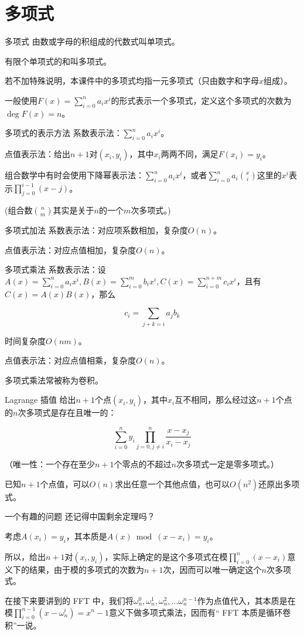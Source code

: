 \documentclass{beamer}
\begin{document}
	\section{多项式}
	\begin{frame}{多项式}
		由数或字母的积组成的代数式叫单项式。
		
		有限个单项式的和叫多项式。
		
		若不加特殊说明，本课件中的多项式均指一元多项式（只由数字和字母$x$组成）。
		
		一般使用$F(x)=\sum\limits_{i=0}^na_ix^i$的形式表示一个多项式，定义这个多项式的次数为$\deg F(x) = n$。
	\end{frame}
	\begin{frame}{多项式的表示方法}
		系数表示法：$\sum\limits_{i=0}^na_ix^i$。
		
		点值表示法：给出$n+1$对$(x_i,y_i)$，其中$x_i$两两不同，满足$F(x_i)=y_i$。
		
		组合数学中有时会使用下降幂表示法：$\sum\limits_{i=0}^na_ix^{\underline{i}}$，或者$\sum\limits_{i=0}^na_i\binom{x}{i}$这里的$x^{\underline{i}}$表示$\prod\limits_{j=0}^{i-1}(x-j)$。
		
		(组合数$\binom{n}{m}$其实是关于$n$的一个$m$次多项式。)
	\end{frame}
	\begin{frame}{多项式加法}
		系数表示法：对应项系数相加，复杂度$O(n)$。
		
		点值表示法：对应点值相加，复杂度$O(n)$。
	\end{frame}
	\begin{frame}{多项式乘法}
		系数表示法：设$A(x)=\sum\limits_{i=0}^na_ix^i,B(x)=\sum\limits_{i=0}^mb_ix^i,C(x)=\sum\limits_{i=0}^{n+m}c_ix^i$，且有$C(x)=A(x)B(x)$，那么
		
		$$c_i=\sum_{j+k=i}a_jb_k$$
		
		时间复杂度$O(nm)$。
		
		点值表示法：对应点值相乘，复杂度$O(n)$。
		
		多项式乘法常被称为卷积。
	\end{frame}
	\begin{frame}{Lagrange 插值}
		给出$n+1$个点$(x_i,y_i)$，其中$x_i$互不相同，那么经过这$n+1$个点的$n$次多项式是存在且唯一的：
		
		$$\sum_{i=0}^ny_i\prod_{j=0,j\neq i}^n\frac{x-x_j}{x_i-x_j}$$
		
		（唯一性：一个存在至少$n+1$个零点的不超过$n$次多项式一定是零多项式。）
		
		已知$n+1$个点值，可以$O(n)$求出任意一个其他点值，也可以$O(n^2)$还原出多项式。
	\end{frame}
	\begin{frame}{一个有趣的问题}
		还记得中国剩余定理吗？
		
		考虑$A(x_i)=y_i$，其本质是$A(x) \bmod (x-x_i) = y_i$。
		
		所以，给出$n+1$对$(x_i,y_i)$，实际上确定的是这个多项式在模$\prod\limits_{i=0}^n(x-x_i)$意义下的结果，由于模的多项式的次数为$n+1$次，因而可以唯一确定这个$n$次多项式。
		
		在接下来要讲到的 FFT 中，我们将$\omega_n^0,\omega_n^1,\omega_n^2,...\omega_n^{n-1}$作为点值代入，其本质是在模$\prod\limits_{i=0}^{n-1}(x-\omega_n^i)=x^n-1$意义下做多项式乘法，因而有“ FFT 本质是循环卷积”一说。
	\end{frame}
\end{document}
